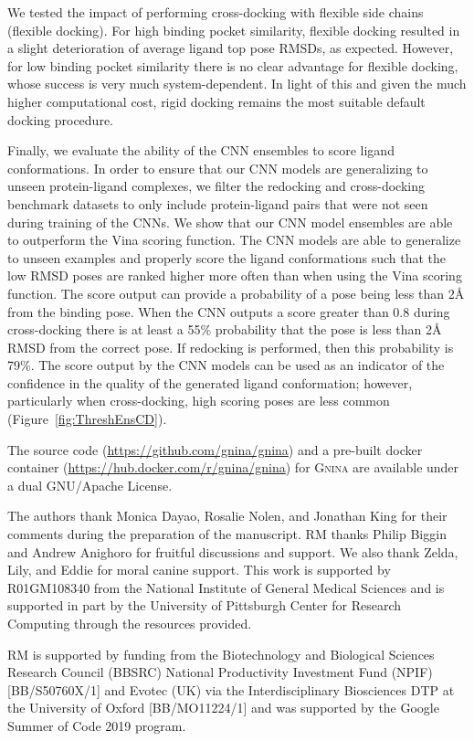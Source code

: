 \documentclass[journal=jcisd8,manuscript=article]{achemso}
\begin{document}
We tested the impact of performing cross-docking with flexible side chains (flexible docking). For high binding pocket similarity, flexible docking resulted in a slight deterioration of average ligand top pose RMSDs, as expected. However, for low binding pocket similarity there is no clear advantage for flexible docking, whose success is very much system-dependent. In light of this and given the much higher computational cost, rigid docking remains the most suitable default docking procedure.

Finally, we evaluate the ability of the CNN ensembles to score ligand conformations. In order to ensure that our CNN models are generalizing to unseen protein-ligand complexes, we filter the redocking and cross-docking benchmark datasets to only include protein-ligand pairs that were not seen during training of the CNNs. We show that our CNN model ensembles are able to outperform the Vina scoring function. The CNN models are able to generalize to unseen examples and properly score the ligand conformations such that the low RMSD poses are ranked higher more often than when using the Vina scoring function. The score output can provide a probability of a pose being less than 2{\AA} from the binding pose. When the CNN outputs a score greater than 0.8 during cross-docking there is at least a 55\% probability that the pose is less than 2{\AA} RMSD from the correct pose. If redocking is performed, then this probability is 79\%. The score output by the CNN models can be used as an indicator of the confidence in the quality of the generated ligand conformation; however, particularly when cross-docking, high scoring poses are less common (Figure~\ref{fig:ThreshEnsCD}).

The source code (\url{https://github.com/gnina/gnina}) and a pre-built docker container (\url{https://hub.docker.com/r/gnina/gnina}) for \textsc{Gnina} are available under a dual GNU/Apache License.


\begin{acknowledgement}
The authors thank Monica Dayao, Rosalie Nolen, and Jonathan King for their comments during the preparation of the manuscript. RM thanks Philip Biggin and Andrew Anighoro for fruitful discussions and support. We also thank Zelda, Lily, and Eddie for moral canine support.
This work is supported by R01GM108340 from the National Institute of General Medical Sciences and is supported in part by the University of Pittsburgh Center for Research Computing through the resources provided.

RM is supported  by  funding  from  the  Biotechnology  and  Biological  Sciences  Research Council (BBSRC) National Productivity Investment Fund (NPIF) [BB/S50760X/1] and Evotec (UK) via the Interdisciplinary Biosciences DTP at the University of Oxford [BB/MO11224/1] and was supported by the Google Summer of Code 2019 program.

\end{acknowledgement}
\end{document}
